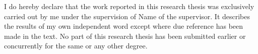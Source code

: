 \begin{declaration}      
	
	
I do hereby declare that the work reported in this research thesis was exclusively carried out by me under the supervision of {Name of the supervisor}. It describes the results of my own independent word except where due reference has been made in the text. No part of this research thesis has been submitted earlier or concurrently for the same or any other degree.
	
	
\end{declaration}
